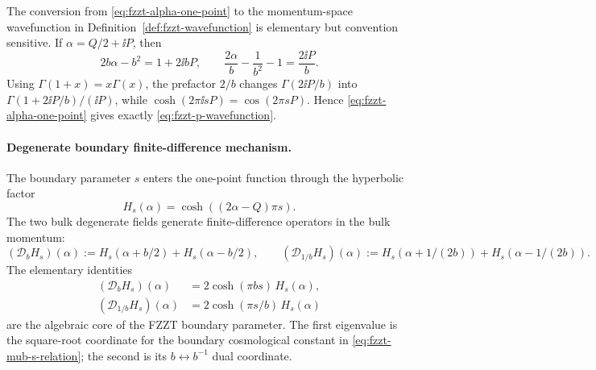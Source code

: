 The conversion from \eqref{eq:fzzt-alpha-one-point} to the
momentum-space wavefunction in Definition~\ref{def:fzzt-wavefunction} is
elementary but convention sensitive.  If \(\alpha=Q/2+\ii P\), then
\[
  2b\alpha-b^2=1+2\ii bP,\qquad
  \frac{2\alpha}{b}-\frac1{b^2}-1=\frac{2\ii P}{b}.
\]
Using \(\Gamma(1+x)=x\Gamma(x)\), the prefactor \(2/b\) changes
\(\Gamma(2\ii P/b)\) into \(\Gamma(1+2\ii P/b)/(\ii P)\), while
\(\cosh(2\pi\ii sP)=\cos(2\pi sP)\).  Hence
\eqref{eq:fzzt-alpha-one-point} gives exactly
\eqref{eq:fzzt-p-wavefunction}.

\paragraph{Degenerate boundary finite-difference mechanism.}
The boundary parameter \(s\) enters the one-point function through the
hyperbolic factor
\[
  H_s(\alpha)=\cosh\!\left((2\alpha-Q)\pi s\right).
\]
The two bulk degenerate fields generate finite-difference operators in the
bulk momentum:
\[
  (\mathcal D_b H_s)(\alpha)
  :=
  H_s(\alpha+b/2)+H_s(\alpha-b/2),
  \qquad
  (\mathcal D_{1/b}H_s)(\alpha)
  :=
  H_s(\alpha+1/(2b))+H_s(\alpha-1/(2b)).
\]
The elementary identities
\begin{align}
  (\mathcal D_bH_s)(\alpha)
  &=
  2\cosh(\pi b s)\,H_s(\alpha),
  \label{eq:fzzt-hyperbolic-b-difference}\\
  (\mathcal D_{1/b}H_s)(\alpha)
  &=
  2\cosh(\pi s/b)\,H_s(\alpha)
  \label{eq:fzzt-hyperbolic-dual-difference}
\end{align}
are the algebraic core of the FZZT boundary parameter.  The first eigenvalue
is the square-root coordinate for the boundary cosmological constant in
\eqref{eq:fzzt-mub-s-relation}; the second is its \(b\leftrightarrow b^{-1}\)
dual coordinate.

